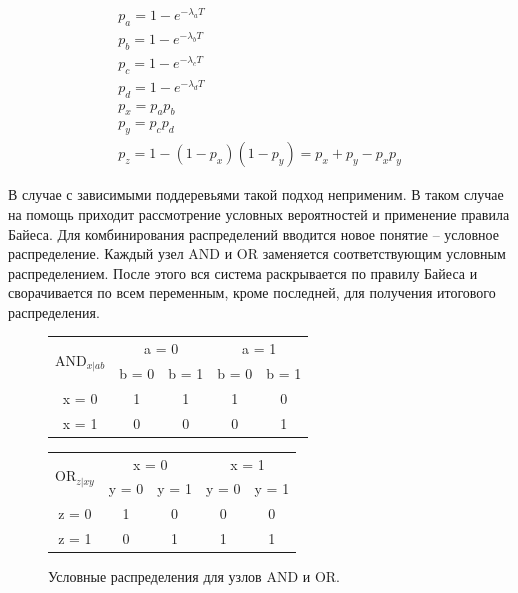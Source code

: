 \documentclass[a4paper, 12pt]{article}
\begin{document}
\begin{equation*}
  \begin{array}{l}
    p_a = 1 - e^{-\lambda_a T} \\
    p_b = 1 - e^{-\lambda_b T} \\
    p_c = 1 - e^{-\lambda_c T} \\
    p_d = 1 - e^{-\lambda_d T} \\
    p_x = p_a p_b \\
    p_y = p_c p_d \\
    p_z = 1 - (1 - p_x) (1 - p_y) = p_x + p_y - p_x p_y
  \end{array}
\end{equation*}

В случае с зависимыми поддеревьями такой подход неприменим. В таком случае на помощь приходит рассмотрение условных вероятностей и применение правила Байеса. Для комбинирования распределений вводится новое понятие -- условное распределение. Каждый узел AND и OR заменяется соответствующим условным распределением. После этого вся система раскрывается по правилу Байеса и сворачивается по всем переменным, кроме последней, для получения итогового распределения.

\begin{figure}[p]
  \centering
  \begin{tabular}{c|c|c|c|c|}
    \cline{2-5}
    \multirow{2}{*}{$\textrm{AND}_{x|ab}$} & \multicolumn{2}{|c|}{a = 0} & \multicolumn{2}{|c|}{a = 1} \\
    \cline{2-5}
    & b = 0 & b = 1 & b = 0 & b = 1 \\
    \cline{1-5}
    \multicolumn{1}{|c|}{x = 0} & 1 & 1 & 1 & 0 \\
    \cline{1-5}
    \multicolumn{1}{|c|}{x = 1} & 0 & 0 & 0 & 1 \\
    \cline{1-5}
  \end{tabular}
  \begin{tabular}{c|c|c|c|c|}
    \cline{2-5}
    \multirow{2}{*}{$\textrm{OR}_{z|xy}$} & \multicolumn{2}{|c|}{x = 0} & \multicolumn{2}{|c|}{x = 1} \\
    \cline{2-5}
    & y = 0 & y = 1 & y = 0 & y = 1 \\
    \cline{1-5}
    \multicolumn{1}{|c|}{z = 0} & 1 & 0 & 0 & 0 \\
    \cline{1-5}
    \multicolumn{1}{|c|}{z = 1} & 0 & 1 & 1 & 1 \\
    \cline{1-5}
  \end{tabular}
  
  \caption{Условные распределения для узлов AND и OR.}
  \label{fig:sft2}
\end{figure}
\end{document}
